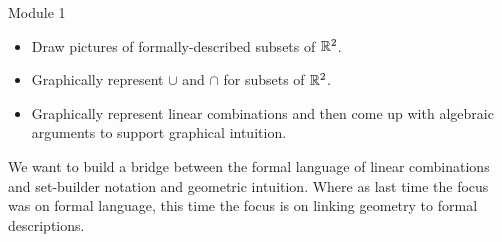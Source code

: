 \documentclass{workbook}
\begin{document}
\begin{lesson}

	Module 1

	\begin{itemize}
		\item Draw pictures of formally-described subsets of $\mathbb{R}^2$.
		\item Graphically represent $\cup$ and $\cap$ for subsets of $\mathbb{R}^2$.
		\item Graphically represent linear combinations and then come up with
			algebraic arguments to support graphical intuition.
	\end{itemize}


	We want to build a bridge between the formal language of linear combinations
	and set-builder notation and geometric intuition. Where as last time
	the focus was on formal language, this time the focus is on linking geometry
	to formal descriptions.


\end{lesson}
\end{document}
